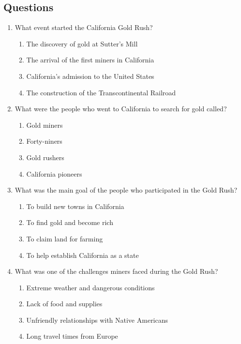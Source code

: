 \documentclass[12pt]{article}
\begin{document}
\subsection*{Questions}
\begin{enumerate}

    \item What event started the California Gold Rush?
    \begin{enumerate}[label=\Alph*.]
        \item The discovery of gold at Sutter's Mill
        \item The arrival of the first miners in California
        \item California's admission to the United States
        \item The construction of the Transcontinental Railroad
    \end{enumerate}

    \vspace{0.5cm}

    \item What were the people who went to California to search for gold called?
    \begin{enumerate}[label=\Alph*.]
        \item Gold miners
        \item Forty-niners
        \item Gold rushers
        \item California pioneers
    \end{enumerate}

    \vspace{0.5cm}

    \item What was the main goal of the people who participated in the Gold Rush?
    \begin{enumerate}[label=\Alph*.]
        \item To build new towns in California
        \item To find gold and become rich
        \item To claim land for farming
        \item To help establish California as a state
    \end{enumerate}

    \vspace{0.5cm}

    \item What was one of the challenges miners faced during the Gold Rush?
    \begin{enumerate}[label=\Alph*.]
        \item Extreme weather and dangerous conditions
        \item Lack of food and supplies
        \item Unfriendly relationships with Native Americans
        \item Long travel times from Europe
    \end{enumerate}


\end{enumerate}
\end{document}
